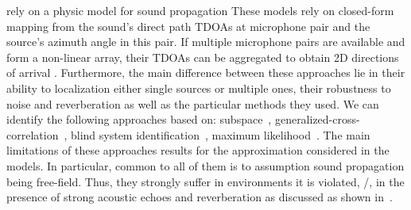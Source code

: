  rely on a physic model for sound propagation 
These models rely on closed-form mapping from the sound's direct path \acl{TDOAs} at microphone pair and the source's azimuth angle in this pair.
If multiple microphone pairs are available and form a non-linear array, their TDOAs can be aggregated to obtain 2D directions of arrival .
Furthermore, the main difference between these approaches lie in their ability to localization either single sources or multiple ones, their robustness to noise and reverberation as well as the particular methods they used.
We can identify the following approaches based on:
subspace~,
generalized-cross-correlation~,
blind system identification~,
maximum likelihood~.
The main limitations of these approaches results for the approximation considered in the models.
In particular, common to all of them is to assumption sound propagation being free-field.
Thus, they strongly suffer in environments it is violated, \eg/, in the presence of strong acoustic echoes and reverberation as discussed as shown in~.

